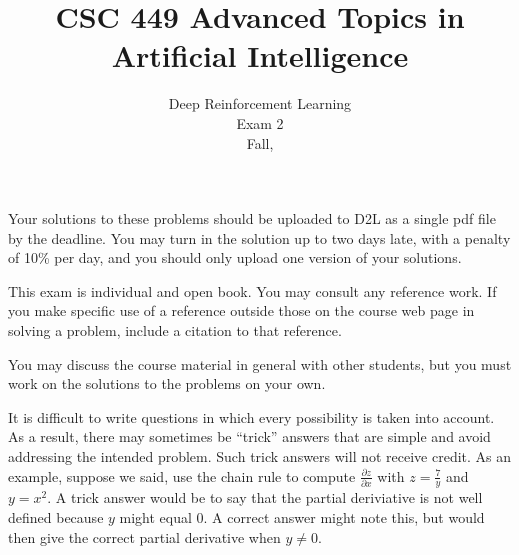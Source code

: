 \documentclass[12pt]{exam}
\title{CSC 449 Advanced Topics in Artificial Intelligence}
\date{Deep Reinforcement Learning\\Exam 2\\Fall, \the\year}
\begin{document}
\maketitle

Your solutions to these problems should be uploaded to D2L as a single
pdf file by the deadline. You may turn in the
solution up to two days late, with a penalty of 10\% per day, and you
should only upload one version of your solutions.

This exam is individual and open book. You may consult any reference
work. If you make specific use of a reference outside those on the
course web page in solving a problem, include a citation to that
reference.


You may discuss the course material in general with other students,
but you must work on the solutions to the problems on your own.


It is difficult to write questions in
which every possibility is taken into account. As a result, there may sometimes
be ``trick'' answers that are simple and avoid addressing the
intended problem. Such trick answers will not receive credit. As an
example, suppose we said, use the chain rule to compute $\frac{\partial z}{\partial x}$ with $z =
\frac{7}{y}$ and $y = x^2$. A trick answer would be to say that the partial
deriviative is not well defined because $y$ might equal $0$. A correct
answer might note this, but would then give the correct partial
derivative when $y \ne 0$.

\newlength{\mytabcolsep}
\setlength{\mytabcolsep}{0.75pt}
\newlength{\zerowidth}
\settowidth{\zerowidth}{0}
\newlength{\normaltabcolsep}
\setlength{\normaltabcolsep}{\tabcolsep}
\end{document}
